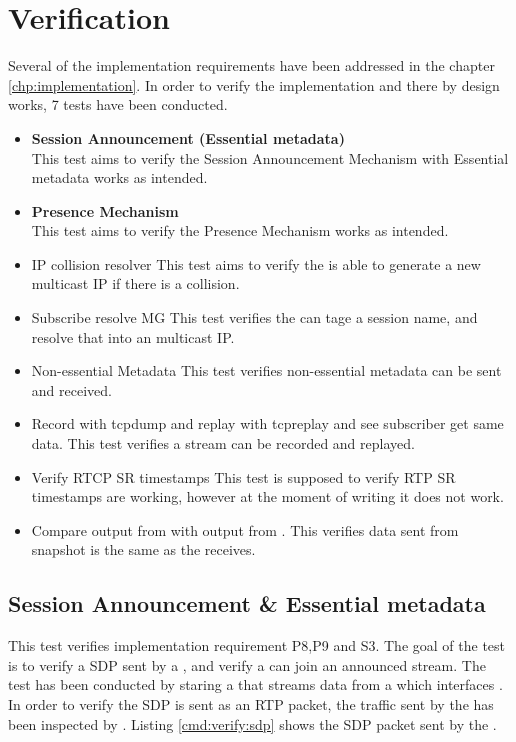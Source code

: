 \section{Verification} \label{sec:design:verification}
Several of the implementation requirements have been addressed in the chapter \ref{chp:implementation}. In order to verify the implementation and there by design works, 7 tests have been conducted.

\begin{itemize}
	\item \textbf{Session Announcement (Essential metadata)}\\
This test aims to verify the Session Announcement Mechanism with Essential metadata works as intended.
	\item \textbf{Presence Mechanism}\\
This test aims to verify the Presence Mechanism works as intended.
	\item IP collision resolver
This test aims to verify the \pub{} is able to generate a new multicast IP if there is a collision.
	\item Subscribe resolve MG
This test verifies the \sub{} can tage a session name, and resolve that into an multicast IP.
	\item Non-essential Metadata
This test verifies non-essential metadata can be sent and received.
	\item Record with tcpdump and replay with tcpreplay and see subscriber get same data.
This test verifies a stream can be recorded and replayed.
	\item Verify RTCP SR timestamps
This test is supposed to verify RTP SR timestamps are working, however at the moment of writing it does not work.
	\item Compare output from \con{} with output from .
This verifies data sent from snapshot is the same as the \con{} receives.
\end{itemize}


\subsection{Session Announcement \& Essential metadata} \label{sec:verify:sessionannouncement}
This test verifies implementation requirement P8,P9 and S3. The goal of the test is to verify a SDP sent by a \pub{}, and verify a \sub{} can join an announced stream. 
The test has been conducted by staring a \pub{} that streams data from a \con{} which interfaces . In order to verify the SDP is sent as an RTP packet, the traffic sent by the \pub{} has been inspected by . Listing \ref{cmd:verify:sdp} shows the SDP packet sent by the \pub{}.

